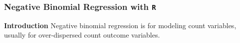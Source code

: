 \documentclass[MASTER.tex]{subfiles}
\begin{document}
	

\begin{frame}[fragile]
\frametitle{Negative Binomial Regression with \texttt{R} }
\Large

\textbf{Introduction}
Negative binomial regression is for modeling count variables, usually for over-dispersed count outcome variables.

\end{frame}


	
\end{document}
